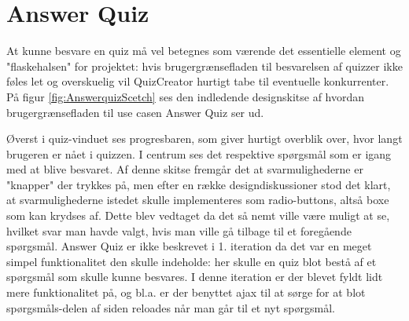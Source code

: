 \section{Answer Quiz}

At kunne besvare en quiz må vel betegnes som værende det essentielle element og "flaskehalsen" for projektet: hvis brugergrænsefladen til besvarelsen af quizzer ikke føles let og overskuelig vil QuizCreator hurtigt tabe til eventuelle konkurrenter. \\
På figur \ref{fig:AnswerquizScetch} ses den indledende designskitse af hvordan brugergrænsefladen til use casen Answer Quiz ser ud. \\


Øverst i quiz-vinduet ses progresbaren, som giver hurtigt overblik over, hvor langt brugeren er nået i quizzen. I centrum ses det respektive spørgsmål som er igang med at blive besvaret. Af denne skitse fremgår det at svarmulighederne er "knapper" der trykkes på, men efter en række designdiskussioner stod det klart, at svarmulighederne istedet skulle implementeres som radio-buttons, altså boxe som kan krydses af. Dette blev vedtaget da det så nemt ville være muligt at se, hvilket svar man havde valgt, hvis man ville gå tilbage til et foregående spørgsmål.
Answer Quiz er ikke beskrevet i 1. iteration da det var en meget simpel funktionalitet den skulle indeholde: her skulle en quiz blot bestå af et spørgsmål som skulle kunne besvares. 
I denne iteration er der blevet fyldt lidt mere funktionalitet på, og bl.a. er der benyttet ajax til at sørge for at blot spørgsmåls-delen af siden reloades når man går til et nyt spørgsmål. 
